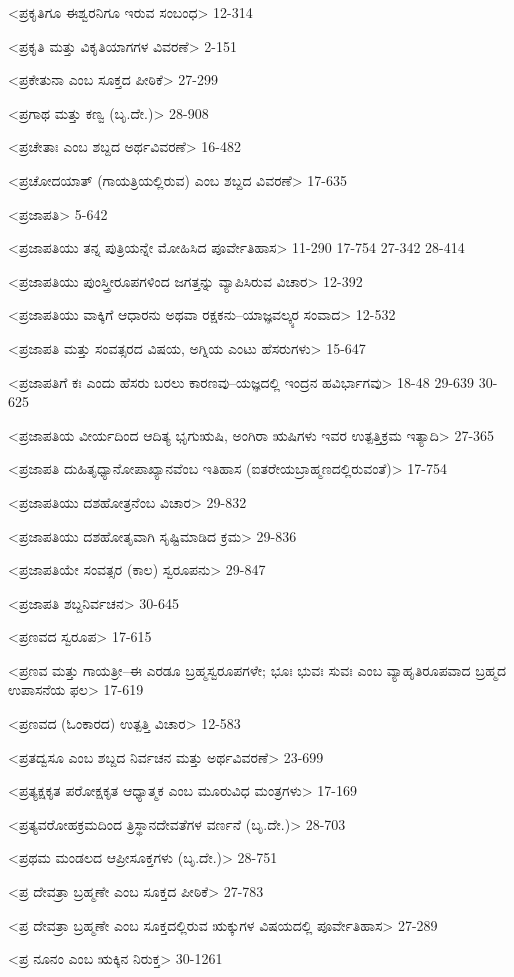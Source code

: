 <ಪ್ರಕೃತಿಗೂ ಈಶ್ವರನಿಗೂ ಇರುವ ಸಂಬಂಧ>
12-314

<ಪ್ರಕೃತಿ ಮತ್ತು ವಿಕೃತಿಯಾಗಗಳ ವಿವರಣೆ>
2-151

<ಪ್ರಕೇತುನಾ ಎಂಬ ಸೂಕ್ತದ ಪೀಠಿಕೆ>
27-299

<ಪ್ರಗಾಥ ಮತ್ತು ಕಣ್ವ (ಬೃ.ದೇ.)>
28-908

<ಪ್ರಚೇತಾಃ ಎಂಬ ಶಬ್ದದ ಅರ್ಥವಿವರಣೆ>
16-482

<ಪ್ರಚೋದಯಾತ್‍ (ಗಾಯತ್ರಿಯಲ್ಲಿರುವ) ಎಂಬ ಶಬ್ದದ ವಿವರಣೆ>
17-635

<ಪ್ರಜಾಪತಿ>
5-642

<ಪ್ರಜಾಪತಿಯು ತನ್ನ ಪುತ್ರಿಯನ್ನೇ ಮೋಹಿಸಿದ ಪೂರ್ವೇತಿಹಾಸ>
11-290 
17-754 
27-342
28-414

<ಪ್ರಜಾಪತಿಯು ಪುಂಸ್ತ್ರೀರೂಪಗಳಿಂದ ಜಗತ್ತನ್ನು ವ್ಯಾಪಿಸಿರುವ ವಿಚಾರ>
12-392

<ಪ್ರಜಾಪತಿಯು ವಾಕ್ಕಿಗೆ ಆಧಾರನು ಅಥವಾ ರಕ್ಷಕನು–ಯಾಜ್ಞವಲ್ಕ್ಯರ ಸಂವಾದ>
12-532

<ಪ್ರಜಾಪತಿ ಮತ್ತು ಸಂವತ್ಸರದ ವಿಷಯ, ಅಗ್ನಿಯ ಎಂಟು ಹೆಸರುಗಳು>
15-647

<ಪ್ರಜಾಪತಿಗೆ ಕಃ ಎಂದು ಹೆಸರು ಬರಲು ಕಾರಣವು–ಯಜ್ಞದಲ್ಲಿ ಇಂದ್ರನ ಹವಿರ್ಭಾಗವು>
18-48 
29-639 
30-625

<ಪ್ರಜಾಪತಿಯ ವೀರ್ಯದಿಂದ ಆದಿತ್ಯ ಭೃಗುಋಷಿ, ಅಂಗಿರಾ ಋಷಿಗಳು ಇವರ ಉತ್ಪತ್ತಿಕ್ರಮ ಇತ್ಯಾದಿ>
27-365

<ಪ್ರಜಾಪತಿ ದುಹಿತೃಧ್ಯಾನೋಪಾಖ್ಯಾನವೆಂಬ ಇತಿಹಾಸ (ಐತರೇಯಬ್ರಾಹ್ಮಣದಲ್ಲಿರುವಂತೆ)>
17-754

<ಪ್ರಜಾಪತಿಯು ದಶಹೋತ್ರನೆಂಬ ವಿಚಾರ>
29-832

<ಪ್ರಜಾಪತಿಯು ದಶಹೋತೃವಾಗಿ ಸೃಷ್ಟಿಮಾಡಿದ ಕ್ರಮ>
29-836

<ಪ್ರಜಾಪತಿಯೇ ಸಂವತ್ಸರ (ಕಾಲ) ಸ್ವರೂಪನು>
29-847

<ಪ್ರಜಾಪತಿ ಶಬ್ದನಿರ್ವಚನ>
30-645

<ಪ್ರಣವದ ಸ್ವರೂಪ>
17-615

<ಪ್ರಣವ ಮತ್ತು ಗಾಯತ್ರೀ–ಈ ಎರಡೂ ಬ್ರಹ್ಮಸ್ವರೂಪಗಳೇ; ಭೂಃ ಭುವಃ ಸುವಃ ಎಂಬ ವ್ಯಾಹೃತಿರೂಪವಾದ ಬ್ರಹ್ಮದ ಉಪಾಸನೆಯ ಫಲ>
17-619

<ಪ್ರಣವದ (ಓಂಕಾರದ) ಉತ್ಪತ್ತಿ ವಿಚಾರ>
12-583

<ಪ್ರತದ್ವಸೂ ಎಂಬ ಶಬ್ದದ ನಿರ್ವಚನ ಮತ್ತು ಅರ್ಥವಿವರಣೆ>
23-699

<ಪ್ರತ್ಯಕ್ಷಕೃತ ಪರೋಕ್ಷಕೃತ ಆಧ್ಯಾತ್ಮಕ ಎಂಬ ಮೂರುವಿಧ ಮಂತ್ರಗಳು>
17-169

<ಪ್ರತ್ಯವರೋಹಕ್ರಮದಿಂದ ತ್ರಿಸ್ಥಾನದೇವತೆಗಳ ವರ್ಣನೆ (ಬೃ.ದೇ.)>
28-703

<ಪ್ರಥಮ ಮಂಡಲದ ಆಪ್ರೀಸೂಕ್ತಗಳು (ಬೃ.ದೇ.)>
28-751

<ಪ್ರ ದೇವತ್ರಾ ಬ್ರಹ್ಮಣೇ ಎಂಬ ಸೂಕ್ತದ ಪೀಠಿಕೆ>
27-783

<ಪ್ರ ದೇವತ್ರಾ ಬ್ರಹ್ಮಣೇ ಎಂಬ ಸೂಕ್ತದಲ್ಲಿರುವ ಋಕ್ಕುಗಳ ವಿಷಯದಲ್ಲಿ ಪೂರ್ವೇತಿಹಾಸ>
27-289

<ಪ್ರ ನೂನಂ ಎಂಬ ಋಕ್ಕಿನ ನಿರುಕ್ತ>
30-1261

